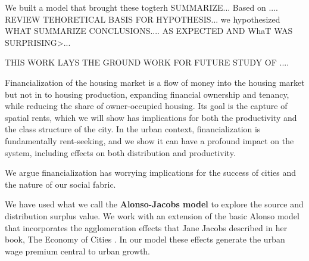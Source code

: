 We built a model that brought these togterh SUMMARIZE...
Based on .... REVIEW TEHORETICAL BASIS FOR HYPOTHESIS... we hypothesized WHAT
SUMMARIZE CONCLUSIONS.... AS EXPECTED AND WhaT WAS SURPRISING>...

THIS WORK LAYS THE GROUND WORK FOR FUTURE STUDY OF ....








Financialization of the housing market is a flow of money into the housing market but not in to housing production, expanding financial ownership and tenancy, while reducing the share of owner-occupied housing. Its goal is the capture of spatial rents, which we will show has implications for both the productivity and the class structure of the city. 
In the urban context, financialization is fundamentally \gls{rent-seeking}, and we show it can have a profound impact on the system, including effects on both distribution and productivity. 


We argue financialization %
has worrying implications for the success of cities and the nature of our social fabric. 

We have used what we call the  \textbf{\gls{Alonso-Jacobs model}} to explore the source and distribution surplus value. We  work with an extension of the basic Alonso model that incorporates the \glspl{agglomeration effect} that Jane Jacobs  described in her book, The Economy of Cities \cite{jacobsEconomyCities1969}. In our model these effects generate the \gls{urban wage premium} central to urban growth. %

